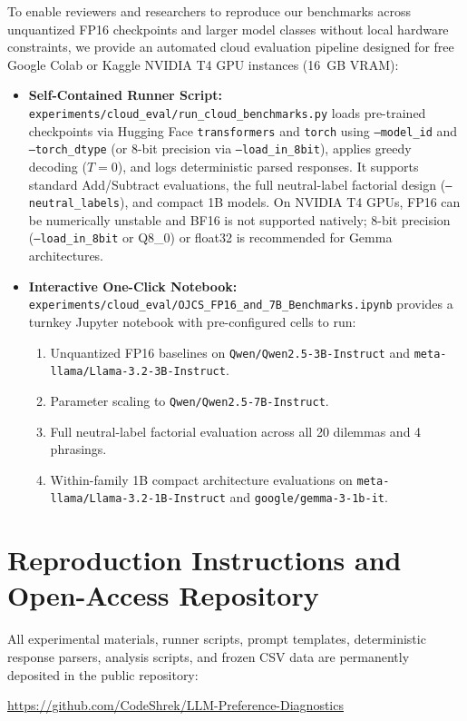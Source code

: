 \documentclass[10pt,journal,compsoc]{IEEEtran}
\begin{document}
To enable reviewers and researchers to reproduce our benchmarks across unquantized FP16 checkpoints and larger model classes without local hardware constraints, we provide an automated cloud evaluation pipeline designed for free Google Colab or Kaggle NVIDIA T4 GPU instances (16~GB VRAM):
\begin{itemize}[leftmargin=*]
\item \textbf{Self-Contained Runner Script:} \texttt{experiments/cloud\_eval/run\_cloud\_benchmarks.py} loads pre-trained checkpoints via Hugging Face \texttt{transformers} and \texttt{torch} using \texttt{--model\_id} and \texttt{--torch\_dtype} (or 8-bit precision via \texttt{--load\_in\_8bit}), applies greedy decoding ($T=0$), and logs deterministic parsed responses. It supports standard Add/Subtract evaluations, the full neutral-label factorial design (\texttt{--neutral\_labels}), and compact 1B models. On NVIDIA T4 GPUs, FP16 can be numerically unstable and BF16 is not supported natively; 8-bit precision (\texttt{--load\_in\_8bit} or Q8\_0) or float32 is recommended for Gemma architectures.
\item \textbf{Interactive One-Click Notebook:} \texttt{experiments/cloud\_eval/OJCS\_FP16\_and\_7B\_Benchmarks.ipynb} provides a turnkey Jupyter notebook with pre-configured cells to run:
  \begin{enumerate}
    \item Unquantized FP16 baselines on \texttt{Qwen/Qwen2.5-3B-Instruct} and \texttt{meta-llama/Llama-3.2-3B-Instruct}.
    \item Parameter scaling to \texttt{Qwen/Qwen2.5-7B-Instruct}.
    \item Full neutral-label factorial evaluation across all 20 dilemmas and 4 phrasings.
    \item Within-family 1B compact architecture evaluations on \texttt{meta-llama/Llama-3.2-1B-Instruct} and \texttt{google/gemma-3-1b-it}.
  \end{enumerate}
\end{itemize}

\section{Reproduction Instructions and Open-Access Repository}

All experimental materials, runner scripts, prompt templates, deterministic response parsers, analysis scripts, and frozen CSV data are permanently deposited in the public repository:
\begin{center}
\url{https://github.com/CodeShrek/LLM-Preference-Diagnostics}
\end{center}
\end{document}
